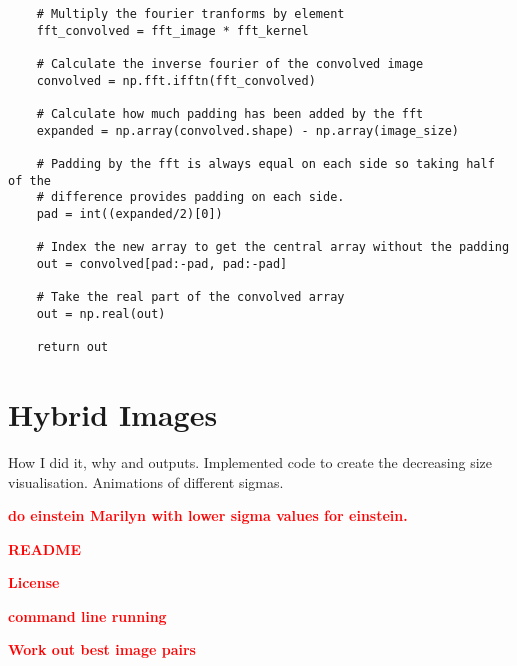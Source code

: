 \documentclass[a4paper,10pt]{article}
\newcommand{\todo}[1] {\textbf{\textcolor{red}{#1}}}
\begin{document}
\begin{lstlisting}
    # Multiply the fourier tranforms by element
    fft_convolved = fft_image * fft_kernel

    # Calculate the inverse fourier of the convolved image
    convolved = np.fft.ifftn(fft_convolved)

    # Calculate how much padding has been added by the fft
    expanded = np.array(convolved.shape) - np.array(image_size)

    # Padding by the fft is always equal on each side so taking half of the
    # difference provides padding on each side.
    pad = int((expanded/2)[0])

    # Index the new array to get the central array without the padding
    out = convolved[pad:-pad, pad:-pad]

    # Take the real part of the convolved array
    out = np.real(out)

    return out
\end{lstlisting}

\section{Hybrid Images}
How I did it, why and outputs. Implemented code to create the decreasing size
visualisation. Animations of different sigmas. 

\todo{do einstein Marilyn with lower sigma values for einstein.}

\todo{README}

\todo{License}

\todo{command line running}

\todo{Work out best image pairs}
\end{document}
